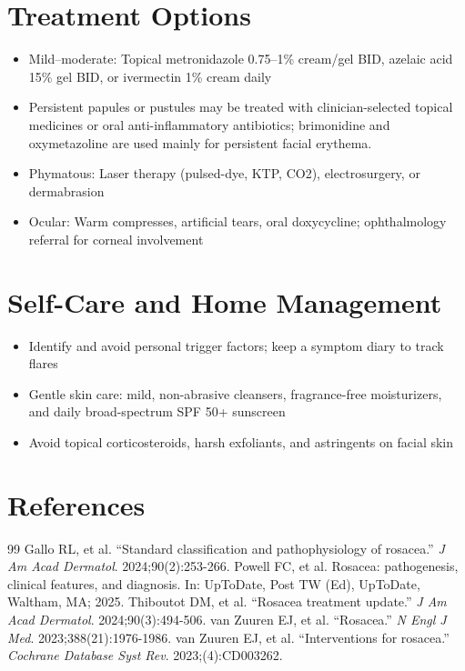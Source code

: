 \section*{Treatment Options}
\begin{itemize}
  \item Mild--moderate: Topical metronidazole 0.75--1\% cream/gel BID, azelaic acid 15\% gel BID, or ivermectin 1\% cream daily
  \item Persistent papules or pustules may be treated with clinician-selected topical medicines or oral anti-inflammatory antibiotics; brimonidine and oxymetazoline are used mainly for persistent facial erythema.
  \item Phymatous: Laser therapy (pulsed-dye, KTP, CO2), electrosurgery, or dermabrasion
  \item Ocular: Warm compresses, artificial tears, oral doxycycline; ophthalmology referral for corneal involvement
\end{itemize}

\section*{Self-Care and Home Management}
\begin{itemize}
  \item Identify and avoid personal trigger factors; keep a symptom diary to track flares
  \item Gentle skin care: mild, non-abrasive cleansers, fragrance-free moisturizers, and daily broad-spectrum SPF 50+ sunscreen
  \item Avoid topical corticosteroids, harsh exfoliants, and astringents on facial skin
\end{itemize}

\section*{References}
\begin{thebibliography}{99}
 Gallo RL, et al. ``Standard classification and pathophysiology of rosacea.'' \emph{J Am Acad Dermatol}. 2024;90(2):253-266.
 Powell FC, et al. Rosacea: pathogenesis, clinical features, and diagnosis. In: UpToDate, Post TW (Ed), UpToDate, Waltham, MA; 2025.
 Thiboutot DM, et al. ``Rosacea treatment update.'' \emph{J Am Acad Dermatol}. 2024;90(3):494-506.
 van Zuuren EJ, et al. ``Rosacea.'' \emph{N Engl J Med}. 2023;388(21):1976-1986.
 van Zuuren EJ, et al. ``Interventions for rosacea.'' \emph{Cochrane Database Syst Rev}. 2023;(4):CD003262.
\end{thebibliography}
